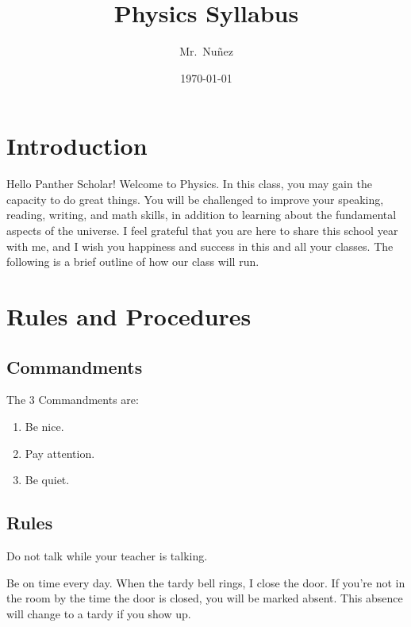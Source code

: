 \documentclass{article}
\title{Physics Syllabus}
\author{Mr.~Nu\~{n}ez}
\date{\today}
\begin{document}
\maketitle

\section{Introduction}

Hello Panther Scholar! Welcome to Physics. In this class, you may gain the capacity to do great things. You will be challenged to improve your speaking, reading, writing, and math skills, in addition to learning about the fundamental aspects of the universe. I feel grateful that you are here to share this school year with me, and I wish you happiness and success in this and all your classes. The following is a brief outline of how our class will run.
\vspace{1em}

\section{Rules and Procedures}

\subsection{Commandments}

The 3 Commandments are:
\vspace{-1ex}

\begin{enumerate}
\setlength\itemsep{0.1ex}
    \item Be nice.
    \item Pay attention.
    \item Be quiet.
    
\end{enumerate}

\subsection{Rules}

\begin{regla}
    Do not talk while your teacher is talking.
\end{regla}

\begin{regla}
    Be on time every day. When the tardy bell rings, I close the door. If you're not in the room by the time the door is closed, you will be marked absent. This absence will change to a tardy if you show up.
\end{regla}
\end{document}
